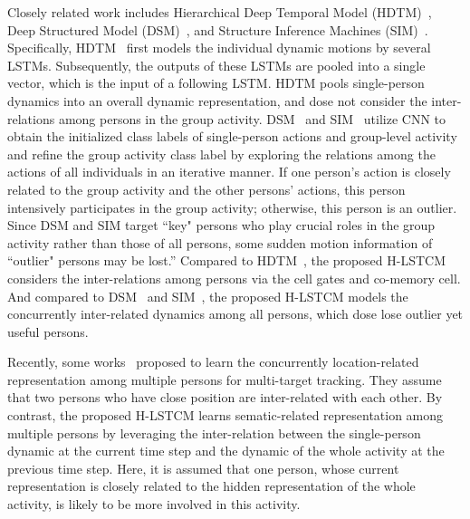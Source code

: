 \documentclass[9pt,journal,letterpaper,twocolumn]{IEEEtran}
\begin{document}
{		Closely related work includes Hierarchical Deep Temporal Model (HDTM)~\cite{ibrahim2015hierarchical}, Deep Structured Model (DSM)~\cite{deng2015deep}, and Structure Inference Machines (SIM)~\cite{deng2016structure}. Specifically, HDTM~\cite{ibrahim2015hierarchical} first models the individual dynamic motions by several LSTMs. Subsequently, the outputs of these LSTMs are pooled into a single vector, which is the input of a following LSTM. HDTM pools single-person dynamics into an overall dynamic representation, and dose not consider the inter-relations among persons in the group activity. 
		DSM~\cite{deng2015deep} and SIM~\cite{deng2016structure} utilize CNN to obtain the initialized class labels of single-person actions and group-level activity and refine the group activity class label by exploring the relations among the actions of all individuals in an iterative manner. If one person's action is closely related to the group activity and the other persons' actions, this person intensively participates in the group activity; otherwise, this person is an outlier. Since DSM and SIM target ``key" persons who play crucial roles in the group activity rather than those of all persons, some sudden motion information of ``outlier" persons may be lost.”
		Compared to HDTM~\cite{ibrahim2015hierarchical}, the proposed H-LSTCM considers the inter-relations among persons via the cell gates and co-memory cell. And compared to DSM~\cite{deng2015deep} and SIM~\cite{deng2016structure}, the proposed H-LSTCM models the concurrently inter-related dynamics among all persons, which dose lose outlier yet useful persons. 
		


		Recently, some works~\cite{alahi2016social,sadeghian2017tracking} proposed to learn the concurrently location-related representation among multiple persons for multi-target tracking. They assume that two persons who have close position are inter-related with each other. By contrast, the proposed H-LSTCM learns sematic-related representation among multiple persons by leveraging the inter-relation between the single-person dynamic at the current time step and the dynamic of the whole activity at the previous time step. Here, it is assumed that one person, whose current representation is closely related to the hidden representation of the whole activity, is likely to be more involved in this activity.
	}
	
\end{document}
